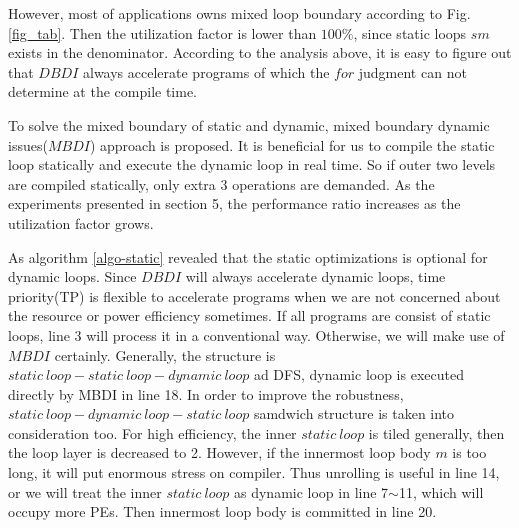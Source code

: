\documentclass[10pt, conference, compsocconf]{IEEEtran}
\begin{document}
However, most of applications owns mixed loop boundary according to  Fig. \ref{fig_tab}. Then the utilization factor is lower than $100\%$, since static loops $sm$ exists in the denominator. According to the analysis above, it is easy to figure out that $DBDI$ always accelerate programs of which the $for$ judgment can not determine at the compile time.

To solve the mixed boundary of static and dynamic, mixed boundary dynamic issues($MBDI$) approach is proposed. It is beneficial for us to compile the static loop statically and execute the dynamic loop in real time. So if outer two levels are compiled statically, only extra 3 operations are demanded. As the experiments presented in section 5, the performance ratio increases as the utilization factor grows.

As algorithm \ref{algo-static} revealed that the static optimizations is optional for dynamic loops. Since $DBDI$ will always accelerate dynamic loops, time priority(TP) is flexible to accelerate programs when we are not concerned about the resource or power efficiency sometimes. If all programs are consist of static loops, line 3 will process it in a conventional way. Otherwise, we will make use of $MBDI$ certainly. Generally, the structure is $static\ loop-static\ loop-dynamic\ loop$ ad DFS, dynamic loop is executed directly by MBDI in line 18. In order to improve the robustness, $static\ loop-dynamic\ loop-static\ loop$ samdwich structure is taken into consideration too. For high efficiency, the inner $static\ loop$ is tiled generally, then the loop layer is decreased to 2. However, if the innermost loop body $m$ is too long, it will put enormous stress on compiler. Thus unrolling is useful in line 14, or we will treat the inner $static\ loop$ as dynamic loop in line 7$\sim$11, which will occupy more PEs. Then innermost loop body is committed in line 20.
\end{document}
